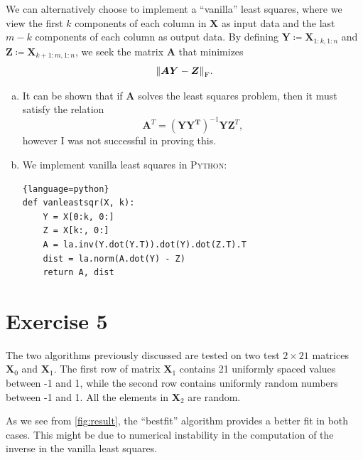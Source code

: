 \documentclass[article, a4paper, oneside, 12pt]{memoir}
\newcommand{\mat}[1]{\bm{#1}}
\newcommand{\frob}[1]{\norm{#1}_{\mathrm{F}}}
\begin{document}
We can alternatively choose to implement a ``vanilla'' least squares, where we
view the first \( k \) components of each column in \( \mat{X} \) as input data
and the last \( m - k \) components of each column as output data. By defining
\( \mat{Y} \coloneqq \mat{X}_{1:k, 1:n} \) and \( \mat{Z} \coloneqq
\mat{X}_{k+1:m, 1:n} \), we seek the matrix \( \mat{A} \) that minimizes
\begin{equation}
    \frob{\mat{AY}-\mat{Z}}.
\end{equation}
\begin{enumerate}[a)]
    \item It can be shown that if \( \mat{A} \) solves the least squares problem, then it
must satisfy the relation
\begin{equation}
    \mat{A}^T = (\mat{YY^T})^{-1} \mat{YZ}^T,
\end{equation}
however I was not successful in proving this.

\item 
We implement vanilla least squares in \textsc{Python}:
\begin{lstlisting}{language=python}
def vanleastsqr(X, k):
    Y = X[0:k, 0:]
    Z = X[k:, 0:]
    A = la.inv(Y.dot(Y.T)).dot(Y).dot(Z.T).T
    dist = la.norm(A.dot(Y) - Z)
    return A, dist
\end{lstlisting}
\end{enumerate}

\section*{Exercise 5}

The two algorithms previously discussed are tested on two test \( 2 \times 21
\) matrices \( \mat{X}_0 \) and \( \mat{X}_1 \). The first row of matrix \(
\mat{X}_1 \) contains 21 uniformly spaced values between -1 and 1, while the
second row contains uniformly random numbers between -1 and 1. All the elements
in \( \mat{X}_2 \) are random.

As we see from
\cref{fig:result}, the ``bestfit'' algorithm provides a better fit in both
cases. This might be due to numerical instability in the computation of the
inverse in the vanilla least squares.
\end{document}
